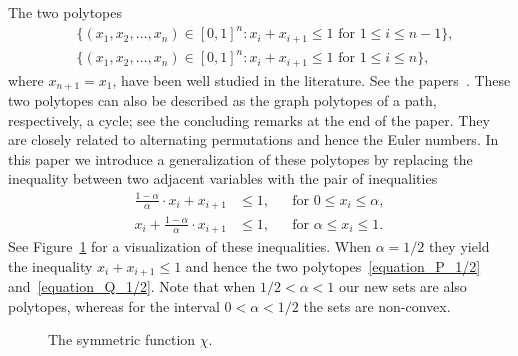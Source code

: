 \documentclass[11pt,reqno]{amsart}
\theoremstyle{definition}
\numberwithin{equation}{section}
\begin{document}
The two polytopes
\begin{align}
&
\{(x_{1},x_{2}, \ldots, x_{n}) \in [0,1]^{n} :
x_{i} + x_{i+1} \leq 1 \text{ for } 1 \leq i \leq n-1\} , 
\label{equation_P_1/2}
\\
&
\{(x_{1},x_{2}, \ldots, x_{n}) \in [0,1]^{n} :
x_{i} + x_{i+1} \leq 1 \text{ for } 1 \leq i \leq n\} ,
\label{equation_Q_1/2}
\end{align}
where $x_{n+1} = x_{1}$,
have been well studied in the literature.
See the papers~\cite{Beukers_Calabi_Kolk,
Ehrenborg_cycle,
Ehrenborg_Levin_Readdy,
Elkies,
Simons_Yao}.
These two polytopes can also be described as the graph polytopes
of a path, respectively, a cycle;
see the concluding remarks at the end of the paper.
They are closely related to alternating permutations
and hence the Euler numbers.
In this paper we introduce a generalization of these polytopes by
replacing the inequality between two adjacent variables
with the pair of inequalities
\begin{align*}
\frac{1-\alpha}{\alpha} \cdot x_{i} + x_{i+1} & \leq 1,
& & \text{for } 0 \leq x_{i} \leq \alpha, \\
x_{i} + \frac{1-\alpha}{\alpha} \cdot x_{i+1} & \leq 1,
& & \text{for } \alpha \leq x_{i} \leq 1 .
\end{align*}
See Figure~\ref{figure} for a visualization of these
inequalities.
When $\alpha = 1/2$ they yield the inequality $x_{i} + x_{i+1} \leq 1$
and hence the two polytopes~\eqref{equation_P_1/2}
and~\eqref{equation_Q_1/2}.
Note that when $1/2 < \alpha < 1$ our new sets are also
polytopes, whereas for the interval $0 < \alpha < 1/2$
the sets are non-convex.

\begin{figure}[b]
\begin{center}
\end{center}
\caption{The symmetric function $\chi$.}
\label{figure}
\end{figure}
\end{document}
